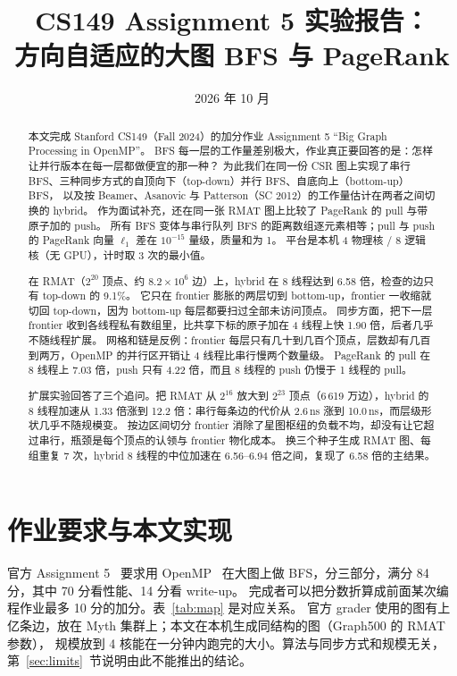 \documentclass[11pt,a4paper]{ctexart}
\title{CS149 Assignment 5 实验报告：\\方向自适应的大图 BFS 与 PageRank}
\author{\authorline}
\date{2026 年 10 月}
\begin{document}
\maketitle

\begin{abstract}
本文完成 Stanford CS149（Fall 2024）的加分作业 Assignment 5 ``Big Graph Processing in OpenMP''。
BFS 每一层的工作量差别极大，作业真正要回答的是：怎样让并行版本在每一层都做便宜的那一种？
为此我们在同一份 CSR 图上实现了串行 BFS、三种同步方式的自顶向下（top-down）并行 BFS、自底向上（bottom-up）BFS，
以及按 Beamer、Asanovic 与 Patterson（SC 2012）的工作量估计在两者之间切换的 hybrid。
作为面试补充，还在同一张 RMAT 图上比较了 PageRank 的 pull 与带原子加的 push。
所有 BFS 变体与串行队列 BFS 的距离数组逐元素相等；pull 与 push 的 PageRank 向量 $\ell_1$ 差在 $10^{-15}$ 量级，质量和为 1。
平台是本机 4 物理核 / 8 逻辑核（无 GPU），计时取 3 次的最小值。

在 RMAT（$2^{20}$ 顶点、约 $8.2\times 10^6$ 边）上，hybrid 在 8 线程达到 6.58 倍，检查的边只有 top-down 的 9.1\%。
它只在 frontier 膨胀的两层切到 bottom-up，frontier 一收缩就切回 top-down，因为 bottom-up 每层都要扫过全部未访问顶点。
同步方面，把下一层 frontier 收到各线程私有数组里，比共享下标的原子加在 4 线程上快 1.90 倍，后者几乎不随线程扩展。
网格和链是反例：frontier 每层只有几十到几百个顶点，层数却有几百到两万，OpenMP 的并行区开销让 4 线程比串行慢两个数量级。
PageRank 的 pull 在 8 线程上 7.03 倍，push 只有 4.22 倍，而且 8 线程的 push 仍慢于 1 线程的 pull。

扩展实验回答了三个追问。把 RMAT 从 $2^{16}$ 放大到 $2^{23}$ 顶点（6\,619 万边），hybrid 的 8 线程加速从 1.33 倍涨到 12.2 倍：串行每条边的代价从 2.6\,ns 涨到 10.0\,ns，而层级形状几乎不随规模变。
按边区间切分 frontier 消除了星图枢纽的负载不均，却没有让它超过串行，瓶颈是每个顶点的认领与 frontier 物化成本。
换三个种子生成 RMAT 图、每组重复 7 次，hybrid 8 线程的中位加速在 6.56--6.94 倍之间，复现了 6.58 倍的主结果。
\end{abstract}

\tableofcontents
\newpage

\section{作业要求与本文实现}
\label{sec:intro}

官方 Assignment 5~\cite{cs149} 要求用 OpenMP~\cite{openmp} 在大图上做 BFS，分三部分，满分 84 分，其中 70 分看性能、14 分看 write-up。
完成者可以把分数折算成前面某次编程作业最多 10 分的加分。表~\ref{tab:map} 是对应关系。
官方 grader 使用的图有上亿条边，放在 Myth 集群上；本文在本机生成同结构的图（Graph500 的 RMAT 参数），
规模放到 4 核能在一分钟内跑完的大小。算法与同步方式和规模无关，第~\ref{sec:limits}~节说明由此不能推出的结论。
\end{document}
